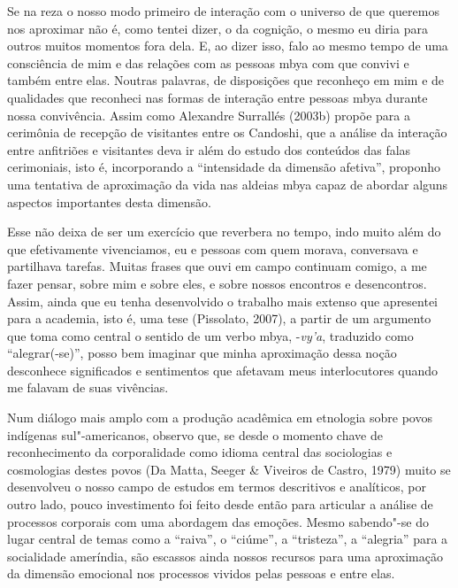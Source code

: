 Se na reza o nosso modo primeiro de interação com o universo de que
queremos nos aproximar não é, como tentei dizer, o da cognição, o mesmo
eu diria para outros muitos momentos fora dela. E, ao dizer isso, falo
ao mesmo tempo de uma consciência de mim e das relações com as pessoas
mbya com que convivi e também entre elas. Noutras palavras, de
disposições que reconheço em mim e de qualidades que reconheci nas
formas de interação entre pessoas mbya durante nossa convivência. Assim
como Alexandre Surrallés (2003b) propõe para a cerimônia de recepção de
visitantes entre os Candoshi, que a análise da interação entre
anfitriões e visitantes deva ir além do estudo dos conteúdos das falas
cerimoniais, isto é, incorporando a ``intensidade da dimensão afetiva'',
proponho uma tentativa de aproximação da vida nas aldeias mbya capaz de
abordar alguns aspectos importantes desta dimensão.

Esse não deixa de ser um exercício que reverbera no tempo, indo muito
além do que efetivamente vivenciamos, eu e pessoas com quem morava,
conversava e partilhava tarefas. Muitas frases que ouvi em campo
continuam comigo, a me fazer pensar, sobre mim e sobre eles, e sobre
nossos encontros e desencontros. Assim, ainda que eu tenha desenvolvido
o trabalho mais extenso que apresentei para a academia, isto é, uma
tese (Pissolato, 2007), a partir de um argumento que toma como central
o sentido de um verbo mbya, -\emph{vy’a}, traduzido como ``alegrar(-se)'', posso
bem imaginar que minha aproximação dessa noção desconhece significados
e sentimentos que afetavam meus interlocutores quando me falavam de
suas vivências.

Num diálogo mais amplo com a produção acadêmica em etnologia sobre povos
indígenas sul"-americanos, observo que, se desde o momento chave de
reconhecimento da corporalidade como idioma central das sociologias e
cosmologias destes povos (Da Matta, Seeger \& Viveiros de Castro,
1979) muito se desenvolveu o nosso campo de estudos em termos
descritivos e analíticos, por outro lado, pouco investimento foi feito
desde então para articular a análise de processos corporais com uma
abordagem das emoções. Mesmo sabendo"-se do lugar central de temas como
a ``raiva'', o ``ciúme'', a ``tristeza'', a ``alegria'' para a socialidade
ameríndia, são escassos ainda nossos recursos para uma aproximação da
dimensão emocional nos processos vividos pelas pessoas e entre elas.

